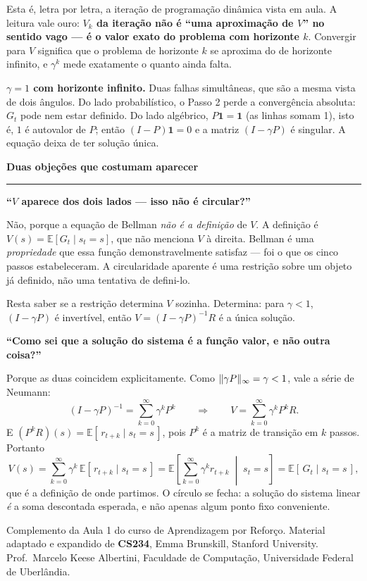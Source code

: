 \documentclass[10pt, a4paper]{article}
\newcounter{secao}
\newcommand{\secao}[1]{%
  \vspace{0.8em}%
  \stepcounter{secao}%
  \noindent{\color{rlLaranja}\rule{1.6em}{2pt}}\hspace{0.5em}%
  {\color{rlCinza}\footnotesize\bfseries\thesecao}\hspace{0.35em}%
  {\color{rlAzul}\large\bfseries #1}%
  \par\vspace{-0.15em}%
  {\color{rlAzul!22}\rule{\linewidth}{0.6pt}}%
  \par\vspace{0.3em}}
\newcounter{passo}
\newcommand{\E}{\mathbb{E}}
\newcommand{\rec}{R}
\DeclarePairedDelimiter{\norm}{\lVert}{\rVert}
\newcommand{\norminf}[1]{\norm{#1}_{\infty}}
\newcommand{\um}{\mathbf{1}}
\begin{document}
\begin{ideiabox}
Esta é, letra por letra, a iteração de programação dinâmica vista em aula. A
leitura vale ouro: \textbf{$V_k$ da iteração não é ``uma aproximação de $V$''
no sentido vago — é o valor exato do problema com horizonte $k$}. Convergir
para $V$ significa que o problema de horizonte $k$ se aproxima do de horizonte
infinito, e $\gamma^k$ mede exatamente o quanto ainda falta.
\end{ideiabox}

\textbf{$\gamma = 1$ com horizonte infinito.} Duas falhas simultâneas, que são a
mesma vista de dois ângulos. Do lado probabilístico, o Passo 2 perde a
convergência absoluta: $G_t$ pode nem estar definido. Do lado algébrico,
$P\um = \um$ (as linhas somam 1), isto é, $1$ é autovalor de $P$; então
$(I - P)\um = 0$ e a matriz $(I-\gamma P)$ é singular. A equação deixa de ter
solução única.

\secao{Duas objeções que costumam aparecer}

\textbf{``$V$ aparece dos dois lados — isso não é circular?''}

Não, porque a equação de Bellman \emph{não é a definição} de $V$. A definição é
$V(s) = \E[G_t \mid s_t = s]$, que não menciona $V$ à direita. Bellman é uma
\emph{propriedade} que essa função demonstravelmente satisfaz — foi o que os
cinco passos estabeleceram. A circularidade aparente é uma restrição sobre um
objeto já definido, não uma tentativa de defini-lo.

Resta saber se a restrição determina $V$ sozinha. Determina: para $\gamma<1$,
$(I-\gamma P)$ é invertível, então $V = (I-\gamma P)^{-1}\rec$ é a única solução.

\smallskip
\textbf{``Como sei que a solução do sistema é a função valor, e não outra coisa?''}

Porque as duas coincidem explicitamente. Como $\norminf{\gamma P} = \gamma < 1$,
vale a série de Neumann:
\[
  (I - \gamma P)^{-1} = \sum_{k=0}^{\infty} \gamma^{k} P^{k}
  \qquad\Longrightarrow\qquad
  V = \sum_{k=0}^{\infty} \gamma^{k} P^{k} \rec .
\]
E $(P^{k}\rec)(s) = \E[\,r_{t+k} \mid s_t = s\,]$, pois $P^k$ é a matriz de
transição em $k$ passos. Portanto
\[
  V(s) = \sum_{k=0}^{\infty} \gamma^{k}\,\E[\,r_{t+k} \mid s_t = s\,]
       = \E\!\left[\sum_{k=0}^{\infty} \gamma^{k} r_{t+k} \;\middle|\; s_t=s\right]
       = \E[\,G_t \mid s_t = s\,],
\]
que é a definição de onde partimos. O círculo se fecha: a solução do sistema
linear \emph{é} a soma descontada esperada, e não apenas algum ponto fixo
conveniente.

\vfill
{\footnotesize\color{rlCinza}
Complemento da Aula 1 do curso de Aprendizagem por Reforço. Material adaptado e
expandido de \textbf{CS234}, Emma Brunskill, Stanford University.
Prof.\ Marcelo Keese Albertini, Faculdade de Computação, Universidade Federal
de Uberlândia.}

\label{fim}
\end{document}
